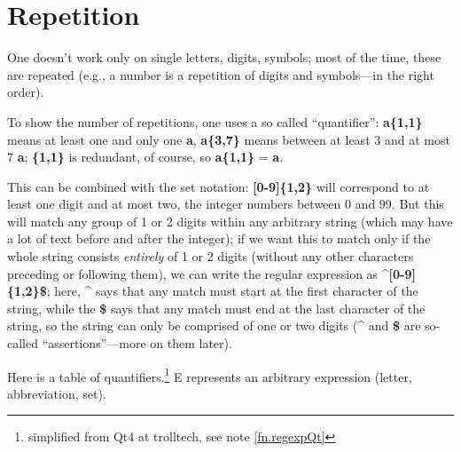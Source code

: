 \section{Repetition}

One doesn't work only on single letters, digits, symbols; most of the time, these are repeated (e.g., a number is a repetition of digits and symbols---in the right order).

To show the number of  repetitions, one uses a so called ``quantifier'': \textbf{a\{1,1\}} means at least one and only one \textbf{a}, \textbf{a\{3,7\}} means between at least 3 and at most 7 \textbf{a}; \textbf{\{1,1\}} is redundant, of course, so \textbf{a\{1,1\}} = \textbf{a}.

This can be combined with the set notation: \textbf{[0-9]\{1,2\}} will correspond to at least one digit and at most two, the integer numbers between 0 and 99. But this will match any group of 1 or 2 digits within any arbitrary string (which may have a lot of text before and after the integer); if we want this to match only if the whole string consists \emph{entirely} of 1 or 2 digits (without any other characters preceding or following them), we can write the regular expression as \textbf{\^{}[0-9]\{1,2\}\$}; here, \textbf{\^{}} says that any match must start at the first character of the string, while the \textbf{\$} says that any match must end at the last character of the string, so the string can only be comprised of one or two digits (\textbf{\^{}} and \textbf{\$} are so-called ``assertions''---more on them later).

Here is a table of quantifiers.\footnote{simplified from Qt4 at trolltech, see note \ref{fn.regexpQt}} E represents an arbitrary expression (letter, abbreviation, set).
\smallskip

